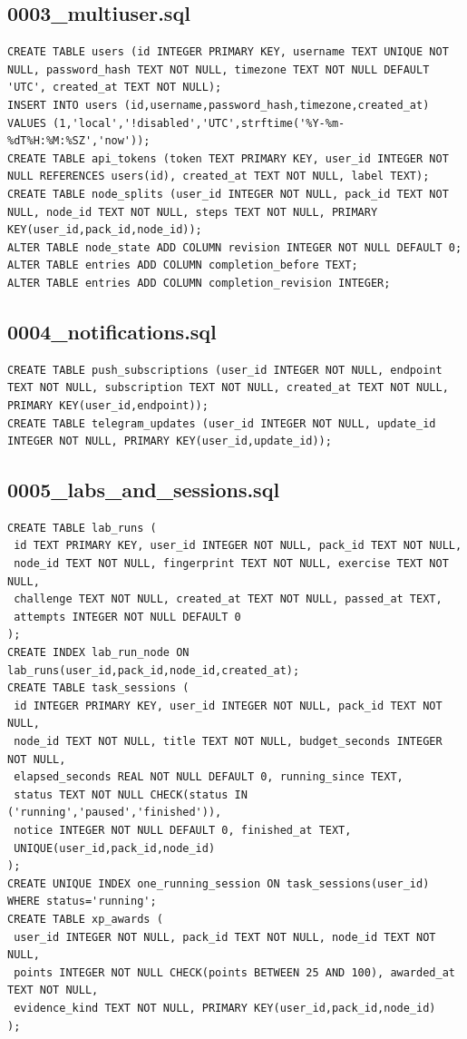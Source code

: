 \subsection{0003\_multiuser.sql}
\begin{verbatim}
CREATE TABLE users (id INTEGER PRIMARY KEY, username TEXT UNIQUE NOT NULL, password_hash TEXT NOT NULL, timezone TEXT NOT NULL DEFAULT 'UTC', created_at TEXT NOT NULL);
INSERT INTO users (id,username,password_hash,timezone,created_at) VALUES (1,'local','!disabled','UTC',strftime('%Y-%m-%dT%H:%M:%SZ','now'));
CREATE TABLE api_tokens (token TEXT PRIMARY KEY, user_id INTEGER NOT NULL REFERENCES users(id), created_at TEXT NOT NULL, label TEXT);
CREATE TABLE node_splits (user_id INTEGER NOT NULL, pack_id TEXT NOT NULL, node_id TEXT NOT NULL, steps TEXT NOT NULL, PRIMARY KEY(user_id,pack_id,node_id));
ALTER TABLE node_state ADD COLUMN revision INTEGER NOT NULL DEFAULT 0;
ALTER TABLE entries ADD COLUMN completion_before TEXT;
ALTER TABLE entries ADD COLUMN completion_revision INTEGER;
\end{verbatim}
\subsection{0004\_notifications.sql}
\begin{verbatim}
CREATE TABLE push_subscriptions (user_id INTEGER NOT NULL, endpoint TEXT NOT NULL, subscription TEXT NOT NULL, created_at TEXT NOT NULL, PRIMARY KEY(user_id,endpoint));
CREATE TABLE telegram_updates (user_id INTEGER NOT NULL, update_id INTEGER NOT NULL, PRIMARY KEY(user_id,update_id));
\end{verbatim}
\subsection{0005\_labs\_and\_sessions.sql}
\begin{verbatim}
CREATE TABLE lab_runs (
 id TEXT PRIMARY KEY, user_id INTEGER NOT NULL, pack_id TEXT NOT NULL,
 node_id TEXT NOT NULL, fingerprint TEXT NOT NULL, exercise TEXT NOT NULL,
 challenge TEXT NOT NULL, created_at TEXT NOT NULL, passed_at TEXT,
 attempts INTEGER NOT NULL DEFAULT 0
);
CREATE INDEX lab_run_node ON lab_runs(user_id,pack_id,node_id,created_at);
CREATE TABLE task_sessions (
 id INTEGER PRIMARY KEY, user_id INTEGER NOT NULL, pack_id TEXT NOT NULL,
 node_id TEXT NOT NULL, title TEXT NOT NULL, budget_seconds INTEGER NOT NULL,
 elapsed_seconds REAL NOT NULL DEFAULT 0, running_since TEXT,
 status TEXT NOT NULL CHECK(status IN ('running','paused','finished')),
 notice INTEGER NOT NULL DEFAULT 0, finished_at TEXT,
 UNIQUE(user_id,pack_id,node_id)
);
CREATE UNIQUE INDEX one_running_session ON task_sessions(user_id) WHERE status='running';
CREATE TABLE xp_awards (
 user_id INTEGER NOT NULL, pack_id TEXT NOT NULL, node_id TEXT NOT NULL,
 points INTEGER NOT NULL CHECK(points BETWEEN 25 AND 100), awarded_at TEXT NOT NULL,
 evidence_kind TEXT NOT NULL, PRIMARY KEY(user_id,pack_id,node_id)
);
\end{verbatim}
